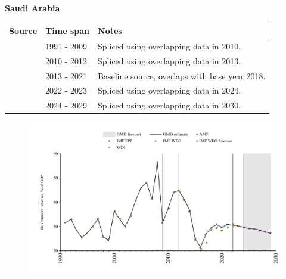 \documentclass[12pt,a4paper,landscape]{article}
\begin{document}
\begin{adjustbox}{max totalsize={\paperwidth}{\paperheight},center}
\begin{minipage}[t][\textheight][t]{\textwidth}
\vspace*{0.5cm}
{}
\begin{center}
{\Large\bfseries Saudi Arabia}
\end{center}
\vspace{0.5cm}
\begin{table}[H]
\centering
\small
\begin{tabular}{|l|l|l|}
\hline
\textbf{Source} & \textbf{Time span} & \textbf{Notes} \\
\hline
\rowcolor{white}\cite{IMF_WEO}& 1991 - 2009 &Spliced using overlapping data in 2010.\\
\rowcolor{lightgray}\cite{WDI}& 2010 - 2012 &Spliced using overlapping data in 2013.\\
\rowcolor{white}\cite{AMF}& 2013 - 2021 &Baseline source, overlaps with base year 2018.\\
\rowcolor{lightgray}\cite{WDI}& 2022 - 2023 &Spliced using overlapping data in 2024.\\
\rowcolor{white}\cite{IMF_WEO_forecast}& 2024 - 2029 &Spliced using overlapping data in 2030.\\
\hline
\end{tabular}
\end{table}
\begin{figure}[H]
\centering
\includegraphics[width=\textwidth,height=0.6\textheight,keepaspectratio]{graphs/SAU_govrev_GDP.pdf}
\end{figure}
\end{minipage}
\end{adjustbox}
\end{document}
